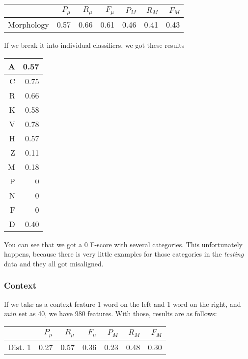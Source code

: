 \documentclass[letterpaper]{article}
\begin{document}
\begin{table}[h]
\begin{tabular}{|r|r|r|r|r|r|r|}
 \hline
 & $P_\mu$ & $R_\mu$ & $F_\mu$ & $P_M$ & $R_M$  & $F_M$ \\ \hline
Morphology & 0.57 & 0.66 & 0.61 & 0.46 & 0.41 & 0.43 \\ \hline
\end{tabular}

\end{table}

If we break it into individual classifiers, we got these results

\begin{tabular}{|r|r|}
\hline
A & 0.57 \\ \hline
    C & 0.75 \\ \hline
    R & 0.66 \\ \hline
    K & 0.58 \\ \hline
    V & 0.78 \\ \hline
    H & 0.57 \\ \hline
    Z & 0.11 \\ \hline
    M & 0.18 \\ \hline
    P & 0 \\ \hline
    N & 0 \\ \hline
    F & 0 \\ \hline
    D & 0.40 \\ \hline

\end{tabular}

You can see that we got a 0 F-score with several categories. This unfortunately happens, because there is very little examples for those categories in the \emph{testing} data and they all got misaligned.

\subsubsection{Context}
If we take as a context feature 1 word on the left and 1 word on the right, and $min$ set as 40, we have 980 features. With those, results are as follows:

\begin{table}[h]

\begin{tabular}{|r|r|r|r|r|r|r|}
 \hline
 & $P_\mu$ & $R_\mu$ & $F_\mu$ & $P_M$ & $R_M$  & $F_M$ \\ \hline
Dist. 1 & 0.27 & 0.57 & 0.36 & 0.23 & 0.48 & 0.30 \\ \hline
\end{tabular}
\end{table}
\end{document}

